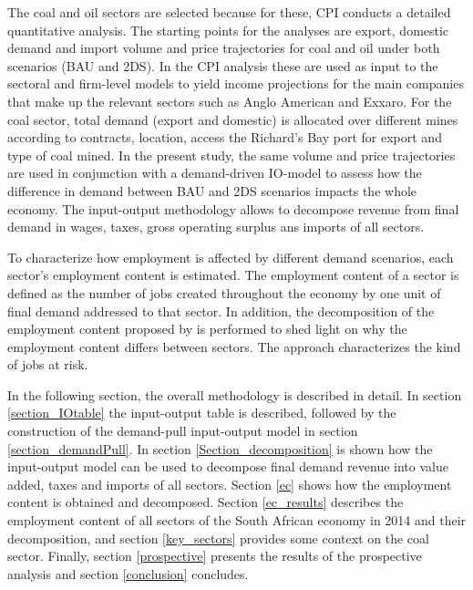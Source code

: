 \documentclass[12pt,english]{article}
\begin{document}
The coal and oil sectors are selected because for these, CPI conducts a detailed quantitative analysis. %
The starting points for the analyses are export, domestic demand and import volume and price trajectories for coal and oil under both scenarios (BAU and 2DS). In the CPI analysis these are used as input to the sectoral and firm-level models to yield income projections for the main companies that make up the relevant sectors such as Anglo American and Exxaro. For the coal sector, total demand (export and domestic) is allocated over different mines according to contracts, location, access the Richard's Bay port for export and type of coal mined. In the present study, the same volume and price trajectories are used in conjunction with a demand-driven IO-model to assess how the difference in demand between BAU and 2DS scenarios impacts the whole economy. The input-output methodology allows to decompose revenue from final demand in wages, taxes, gross operating surplus ans imports of all sectors.

To characterize how employment is affected by different demand scenarios, each sector's employment content is estimated. The employment content of a sector is defined as the number of jobs created throughout the economy by one unit of final demand addressed to that sector. In addition, the decomposition of the employment content proposed by \citep{perrier2017transition} is performed to shed light on why the employment content differs between sectors. The approach characterizes the kind of jobs at risk.

In the following section, the overall methodology is described in detail. In section \ref{section_IOtable} the input-output table is described, followed by the construction of the demand-pull input-output model in section \ref{section_demandPull}. In section \ref{Section_decomposition} is shown how the input-output model can be used to decompose final demand revenue into value added, taxes and imports of all sectors. Section \ref{ec} shows how the employment content is obtained and decomposed. Section \ref{ec_results} 
describes the employment content of all sectors of the South African economy in 2014 and their decomposition, and section \ref{key_sectors}
provides some context on the coal sector. Finally, section \ref{prospective} presents the results of the prospective analysis and section \ref{conclusion} concludes.
\end{document}
